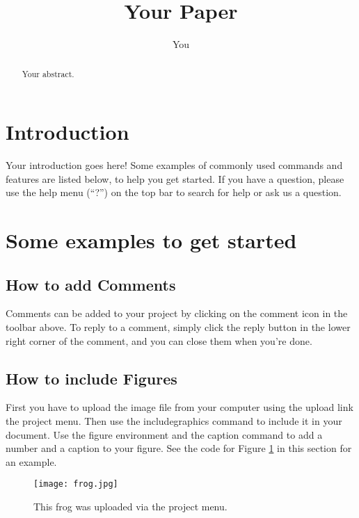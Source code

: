 \documentclass[a4paper]{article}
\title{Your Paper}
\author{You}
\begin{document}
\maketitle

\begin{abstract}
Your abstract.

\end{abstract}

\section{Introduction}

Your introduction goes here! Some examples of commonly used commands and features are listed below, to help you get started. If you have a question, please use the help menu (``?'') on the top bar to search for help or ask us a question. 

\section{Some examples to get started}

\subsection{How to add Comments}

Comments can be added to your project by clicking on the comment icon in the toolbar above. %
%
%
To reply to a comment, simply click the reply button in the lower right corner of the comment, and you can close them when you're done.

\subsection{How to include Figures}

First you have to upload the image file from your computer using the upload link the project menu. Then use the includegraphics command to include it in your document. Use the figure environment and the caption command to add a number and a caption to your figure. See the code for Figure \ref{fig:frog} in this section for an example.

\begin{figure}
\centering
\texttt{[image: frog.jpg]}
\caption{\label{fig:frog}This frog was uploaded via the project menu.}
\end{figure}
\end{document}
